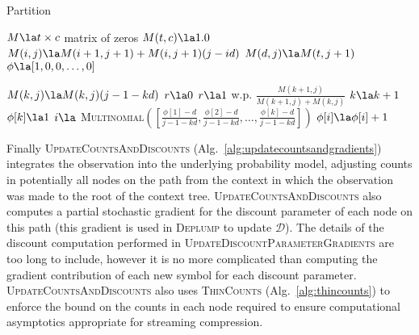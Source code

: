 \begin{algorithm}[t!]
	\caption{Partition} \label{alg:samplepartition}
	\begin{algorithmic}[1]
	
		\State $M \la  t \times c$ matrix of zeros
		\State $M(t,c) \la 1.0$
				\State $M(i,j) \la M(i +1, j+1) + M(i,j+1)(j - id)$ 
			\EndFor
			\State $M(d,j) \la M(t,j+1)$
		\EndFor
		\State $\phi \la [1,0,0,\ldots, 0]$ 
		
			\State $M(k,j) \la M(k,j)(j-1 -k d)$
			\State $r \la 0$
			\State $r \la 1 $ w.p. $\frac{M(k+1,j)}{M(k+1,j) + M(k,j)}$
				\State $k \la k + 1$
				\State $\phi[k]  \la 1$
			\Else
				\State $i \la$ \textsc{Multinomial}$([\frac{\phi[1] - d}{j-1 -kd}, \frac{\phi[2] - d}{j-1 -kd}, \ldots, \frac{\phi[k] - d}{j-1 -kd}])$
				\State $\phi[i] \la \phi[i] + 1$
			\EndIf
		\EndFor
	\EndFunction
		\end{algorithmic}
\end{algorithm}

Finally \textsc{UpdateCountsAndDiscounts} (Alg.~\ref{alg:updatecountsandgradients}) integrates the observation into the underlying probability model, adjusting counts in potentially all nodes on the path from the context in which the observation was made to the root of the context tree.   \textsc{UpdateCountsAndDiscounts} also computes a partial stochastic gradient for the discount parameter of each node on this path (this gradient is used in \textsc{Deplump} to update $\mathcal{D}$).  The details of the discount computation performed in \textsc{UpdateDiscountParameterGradients} are too long to include, however it is no more complicated than computing the gradient contribution of each new symbol for each discount parameter. \textsc{UpdateCountsAndDiscounts} also uses \textsc{ThinCounts} (Alg.~\ref{alg:thincounts}) to enforce the bound on the counts in each node required to ensure computational asymptotics appropriate for streaming compression. 



